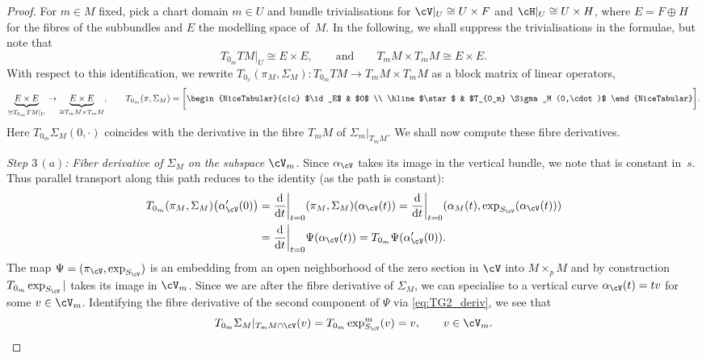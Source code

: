 \begin{proof}
For $m \in M$ fixed, pick a chart domain $m\in U$ and bundle trivialisations for $\cV|_U\cong U \times F$ and $\cH|_U \cong U \times H$, where $E=F\oplus H$ for the fibres of the subbundles and $E$ the modelling space of~$M$. In the following, we shall suppress the trivialisations in the formulae, but note that
\begin{displaymath}
 T_{0_m}TM|_U \cong E \times E, \qquad \text{and}\qquad T_m M \times T_m M\cong E \times E.
\end{displaymath}
With respect to this identification, we rewrite $T_{0_x} (\pi_M,\Sigma_M) \colon T_{0_m} TM \rightarrow T_m M \times T_{m} M$ as a block matrix of linear operators,
\begin{align}\label{eq:blockoperator}
\underbrace{E \times E}_{\cong T_{0_m}TM|_U} \rightarrow \underbrace{E\times E}_{\cong T_mM\times T_mM}, \qquad T_{0_m} (\pi,\Sigma_M) = \biggl[\begin{NiceTabular}{c|c}
$\id_E$ & $0$ \\ \hline
$\star$ & $T_{0_m} \Sigma_M (0,\cdot)$
\end{NiceTabular}\biggr].
\end{align}
Here $T_{0_m} \Sigma_M (0,\cdot)$ coincides with the derivative in the fibre $T_m M$ of $\Sigma_m|_{T_mM }$. We shall now compute these fibre derivatives.

{\it Step $3\,(a)$:} \emph{Fiber derivative of $\Sigma_M$ on the subspace $\cV_m$.} Since $\alpha_\cV$ takes its image in the vertical bundle, we note that  is constant in~$s$. Thus parallel transport along this path reduces to the identity (as the path is constant):
\begin{align*}
T_{0_m} (\pi_M,\Sigma_M)\bigl(\alpha_\cV'(0)\bigr) &= \frac{{\rm d}}{{\rm d}t}\biggr|_{t=0} (\pi_M,\Sigma_M)(\alpha_\cV (t)) = \frac{{\rm d}}{{\rm d}t}\biggr|_{t=0} (\alpha_M (t), \exp_{S_{\cV}} (\alpha_\cV (t))) \\
&= \frac{{\rm d}}{{\rm d}t}\biggr|_{t=0} \Psi (\alpha_{\cV} (t)) =T_{0_m}\Psi (\alpha_{\cV}'(0)).
\end{align*}
The map $\Psi = (\pi_{\cV},\exp_{S_{\cV}})$ is an embedding from an open neighborhood of the zero section in $\cV$ into $M \times_p M$ and by construction $T_{0_m} \exp_{S_{\cV}}|$ takes its image in $\cV_m$. Since we are after the fibre derivative of $\Sigma_M$, we can specialise to a vertical curve $\alpha_{\cV}(t)=tv$ for some $v\in \cV_m$. Identifying the fibre derivative of the second component of $\Psi$ via \eqref{eq:TG2_deriv}, we see that
\[T_{0_m}\Sigma_M|_{T_m M \cap \cV} (v)= T_{0_m}\exp_{S_{\cV}}^m (v)=v,\qquad v \in \cV_m.\]


\end{proof}
